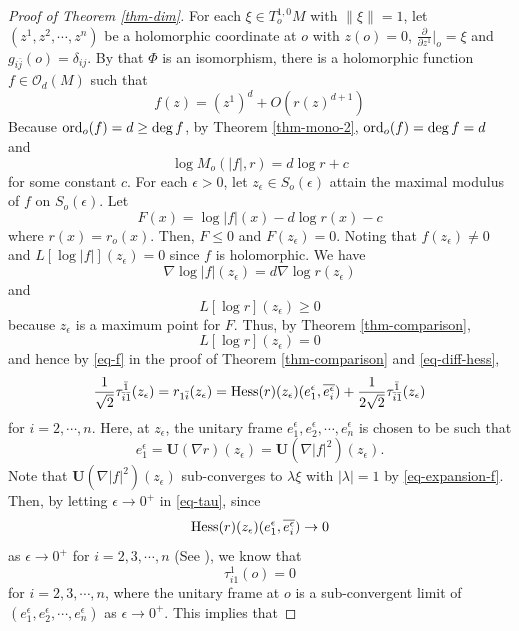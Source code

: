 \documentclass[12pt]{amsart}
\def\ol{\overline}
\def\e{\epsilon}
\def\p{\partial}
\def\ol{\overline}
\theoremstyle{definition}
\theoremstyle{remark}
\numberwithin{equation}{section}
\def\bi{{\bar i}}
\def\ord{{\rm ord}}
\def\Hess{{\rm Hess}}
\begin{document}
\begin{proof}[Proof of Theorem \ref{thm-dim}]
For each $\xi\in T^{1,0}_oM$ with $\|\xi\|=1$, let $(z^1,z^2,\cdots,z^n)$ be a holomorphic coordinate at $o$ with $z(o)=0$, $\frac{\p}{\p z^1}\big|_o=\xi$ and $g_{i\bar j}(o)=\delta_{ij}$. By that $\Phi$ is an isomorphism, there is a holomorphic function $f\in \mathcal O_d(M)$ such that
\begin{equation}\label{eq-expansion-f}
f(z)=(z^1)^d+O(r(z)^{d+1})
\end{equation}
Because $\ord_o(f)=d\geq \deg f$, by Theorem \ref{thm-mono-2}, $\ord_o(f)=\deg f=d$ and
\begin{equation}
\log M_o(|f|,r)=d\log r+c
\end{equation}
for some constant $c$. For each $\e>0$, let $z_\e\in S_o(\e)$ attain the maximal modulus of $f$ on $S_o(\e)$. Let
$$F(x)=\log|f|(x)-d\log r(x)-c$$
where $r(x)=r_o(x)$. Then, $F\leq 0$ and $F(z_\e)=0$. Noting that $f(z_\e)\neq 0$ and $L[\log|f|](z_\e)=0$ since $f$ is holomorphic. We have
\begin{equation}
\nabla\log|f|(z_\e)=d\nabla\log r(z_\e)
\end{equation}
and
\begin{equation}
L[\log r](z_\e)\geq 0
\end{equation}
because $z_\e$ is a maximum point for $F$. Thus, by Theorem  \ref{thm-comparison},
\begin{equation}
L[\log r](z_\e)=0
\end{equation}
and hence by \eqref{eq-f} in the proof of Theorem  \ref{thm-comparison} and \eqref{eq-diff-hess},
\begin{equation}\label{eq-tau}
\frac{1}{\sqrt 2}\tau_{\bi\bar1}^{\bar 1}(z_\e)=r_{1\bi}(z_\e)=\Hess(r)(z_\e)(e_1^\e,\ol{e_i^\e})+\frac{1}{2\sqrt 2}\tau_{\bar i\bar 1}^{\bar 1}(z_\e)
\end{equation}
for $i=2,\cdots,n$. Here, at $z_\e$, the unitary frame $e_1^\e,e_2^\e,\cdots,e_n^\e$ is chosen to be such that
$$e_1^\e=\mathbf{U}(\nabla r)(z_\e)=\mathbf{U}(\nabla|f|^2)(z_\e).$$
Note that $\mathbf{U}(\nabla|f|^2)(z_\e)$ sub-converges to $\lambda\xi$ with $|\lambda|=1$ by \eqref{eq-expansion-f}. Then, by letting $\e\to0^+$ in \eqref{eq-tau}, since
\begin{equation}
\Hess(r)(z_\e)(e_1^\e,\ol{e_i^\e})\to 0
\end{equation}
as $\e\to 0^+$ for $i=2,3,\cdots,n$ (See \cite[Lemma 2.2]{TY}), we know that
\begin{equation}
\tau_{i1}^1(o)=0
\end{equation}
for $i=2,3,\cdots,n$, where the unitary frame at $o$ is a sub-convergent limit of $(e_1^\e,e_2^\e,\cdots,e_n^\e)$ as $\e\to 0^+$. This implies that

\end{proof}
\end{document}
